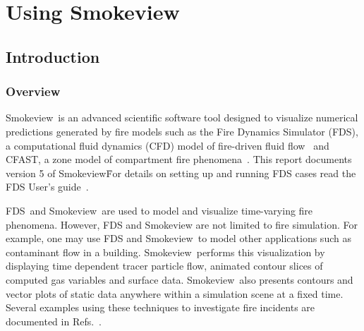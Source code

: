 \documentclass[11pt,twoside]{book}
\newcommand{\FDS}{{FDS}}
\newcommand{\fds}{{FDS}}
\newcommand{\Smokeview}{{Smokeview}}
\newcommand{\smokeview}{{Smokeview}}
\begin{document}
\tableofcontents
\listoffigures
\listoftables

\mainmatter


%
%
%

\part{Using Smokeview}
\chapter{Introduction}
\section{Overview}
\Smokeview\ is an advanced scientific software tool designed to visualize numerical
predictions generated by fire models such as the Fire Dynamics Simulator (\fds),
a computational fluid dynamics (CFD) model of fire-driven fluid
flow~\cite{FDS_Tech_Guide_5} and CFAST, a zone model of compartment fire phenomena~\cite{Jones:2004A}. This report documents version 5 of
\smokeview\. For details on setting up and
running FDS cases read the FDS User's
guide~\cite{FDS_Users_Guide_5}.

\FDS\ and \smokeview\ are used to model and visualize time-varying fire
phenomena. However, FDS and Smokeview are not limited to fire
simulation. For example, one may use FDS and \smokeview\ to model
other applications such as contaminant flow in a building.
\Smokeview\ performs this visualization by displaying time
dependent tracer particle flow, animated contour slices of
computed gas variables and surface data. \Smokeview\ also presents
contours and vector plots of static data anywhere within a
simulation scene at a fixed time. Several examples using these
techniques to investigate fire incidents are documented in
Refs.~\cite{CHERRYROAD,IOWA,HOUSTON,WTC}.
\end{document}
